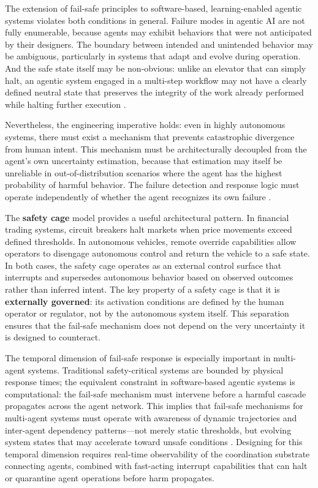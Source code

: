 The extension of fail-safe principles to software-based, learning-enabled agentic systems violates both conditions in general. Failure modes in agentic AI are not fully enumerable, because agents may exhibit behaviors that were not anticipated by their designers. The boundary between intended and unintended behavior may be ambiguous, particularly in systems that adapt and evolve during operation. And the safe state itself may be non-obvious: unlike an elevator that can simply halt, an agentic system engaged in a multi-step workflow may not have a clearly defined neutral state that preserves the integrity of the work already performed while halting further execution \cite{wiener1948}.

Nevertheless, the engineering imperative holds: even in highly autonomous systems, there must exist a mechanism that prevents catastrophic divergence from human intent. This mechanism must be architecturally decoupled from the agent's own uncertainty estimation, because that estimation may itself be unreliable in out-of-distribution scenarios where the agent has the highest probability of harmful behavior. The failure detection and response logic must operate independently of whether the agent recognizes its own failure \cite{bansal2019}.

The \textbf{safety cage} model provides a useful architectural pattern. In financial trading systems, circuit breakers halt markets when price movements exceed defined thresholds. In autonomous vehicles, remote override capabilities allow operators to disengage autonomous control and return the vehicle to a safe state. In both cases, the safety cage operates as an external control surface that interrupts and supersedes autonomous behavior based on observed outcomes rather than inferred intent. The key property of a safety cage is that it is \textbf{externally governed}: its activation conditions are defined by the human operator or regulator, not by the autonomous system itself. This separation ensures that the fail-safe mechanism does not depend on the very uncertainty it is designed to counteract.

The temporal dimension of fail-safe response is especially important in multi-agent systems. Traditional safety-critical systems are bounded by physical response times; the equivalent constraint in software-based agentic systems is computational: the fail-safe mechanism must intervene before a harmful cascade propagates across the agent network. This implies that fail-safe mechanisms for multi-agent systems must operate with awareness of dynamic trajectories and inter-agent dependency patterns—not merely static thresholds, but evolving system states that may accelerate toward unsafe conditions \cite{dijkstra1982}. Designing for this temporal dimension requires real-time observability of the coordination substrate connecting agents, combined with fast-acting interrupt capabilities that can halt or quarantine agent operations before harm propagates.

